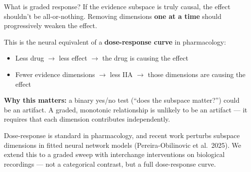 \documentclass[aspectratio=169,11pt]{beamer}
\begin{document}
\begin{frame}{What is graded response?}
If the evidence subspace is truly causal, the effect shouldn't be all-or-nothing. Removing dimensions \textbf{one at a time} should progressively weaken the effect.

\vspace{0.4em}
This is the neural equivalent of a \textbf{dose-response curve} in pharmacology:

\vspace{0.2em}
\begin{itemize}\setlength\itemsep{3pt}
  \item Less drug $\rightarrow$ less effect $\rightarrow$ the drug is causing the effect
  \item Fewer evidence dimensions $\rightarrow$ less IIA $\rightarrow$ those dimensions are causing the effect
\end{itemize}

\vspace{0.4em}
\textbf{Why this matters:} a binary yes/no test (``does the subspace matter?'') could be an artifact. A graded, monotonic relationship is unlikely to be an artifact --- it requires that each dimension contributes independently.

\vspace{0.2em}
{\scriptsize Dose-response is standard in pharmacology, and recent work perturbs subspace dimensions in fitted neural network models (Pereira-Obilinovic et al.\ 2025). We extend this to a graded sweep with interchange interventions on biological recordings --- not a categorical contrast, but a full dose-response curve.}
\end{frame}
\end{document}
